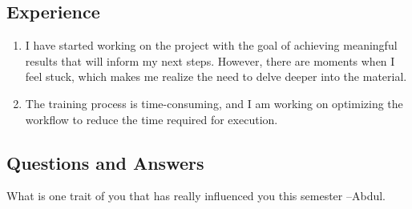 \subsection*{Experience}

\begin{enumerate}
    \item I have started working on the project with the goal of achieving meaningful results that will inform my next steps. However, there are moments when I feel stuck, which makes me realize the need to delve deeper into the material.
    
    \item The training process is time-consuming, and I am working on optimizing the workflow to reduce the time required for execution.
\end{enumerate}

\subsection*{Questions and Answers}
What is one trait of you that has really influenced you this semester  --Abdul.
